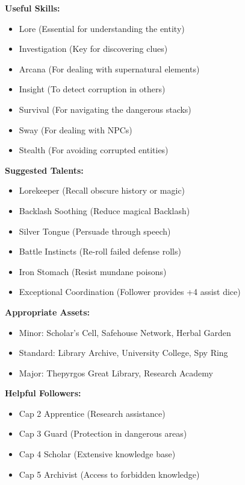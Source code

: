 \documentclass[11pt]{article}
\begin{document}
\textbf{Useful Skills:}
\begin{itemize}
    \item Lore (Essential for understanding the entity)
    \item Investigation (Key for discovering clues)
    \item Arcana (For dealing with supernatural elements)
    \item Insight (To detect corruption in others)
    \item Survival (For navigating the dangerous stacks)
    \item Sway (For dealing with NPCs)
    \item Stealth (For avoiding corrupted entities)
\end{itemize}

\textbf{Suggested Talents:}
\begin{itemize}
    \item Lorekeeper (Recall obscure history or magic)
    \item Backlash Soothing (Reduce magical Backlash)
    \item Silver Tongue (Persuade through speech)
    \item Battle Instincts (Re-roll failed defense rolls)
    \item Iron Stomach (Resist mundane poisons)
    \item Exceptional Coordination (Follower provides +4 assist dice)
\end{itemize}

\textbf{Appropriate Assets:}
\begin{itemize}
    \item Minor: Scholar's Cell, Safehouse Network, Herbal Garden
    \item Standard: Library Archive, University College, Spy Ring
    \item Major: Thepyrgos Great Library, Research Academy
\end{itemize}

\textbf{Helpful Followers:}
\begin{itemize}
    \item Cap 2 Apprentice (Research assistance)
    \item Cap 3 Guard (Protection in dangerous areas)
    \item Cap 4 Scholar (Extensive knowledge base)
    \item Cap 5 Archivist (Access to forbidden knowledge)
\end{itemize}
\end{document}
